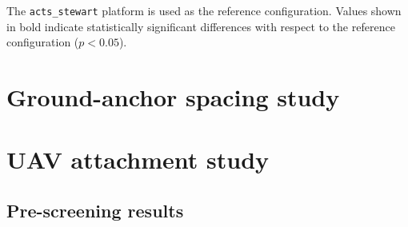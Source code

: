 The \texttt{acts\_stewart} platform is used as the reference configuration. Values shown in bold indicate statistically significant differences with respect to the reference configuration ($p < 0.05$).


\section{Ground-anchor spacing study}
\label{app:ground-spacing}



\newpage
\section{UAV attachment study}
\label{app:uav-attachment}
\subsection{Pre-screening results}

